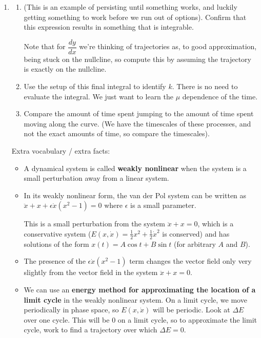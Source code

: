 \documentclass[12pt]{amsart}
\theoremstyle{plain}
\theoremstyle{definition}
\theoremstyle{definition}
\theoremstyle{plain}
\begin{document}
    \begin{enumerate}\item[]
        \begin{enumerate}[start=6]
\item[] (This is an example of persisting until something works, and luckily getting something to work before we run out of options). Confirm that this expression results in something that is integrable.

Note that for $\dfrac{dy}{dx}$ we're thinking of trajectories as, to good approximation, being stuck on the nullcline, so compute this by assuming the trajectory is exactly on the nullcline.
\item Use the setup of this final integral to identify $k$. There is no need to evaluate the integral. We just want to learn the $\mu$ dependence of the time.
\item Compare the amount of time spent jumping to the amount of time spent moving along the curve. (We have the timescales of these processes, and not the exact amounts of time, so compare the timescales).
        \end{enumerate}
        Extra vocabulary / extra facts:
        \begin{itemize}
            \item A dynamical system is called \textbf{weakly nonlinear} when the system is a small perturbation away from a linear system.
            \item In its weakly nonlinear form, the van der Pol system can be written as $\ddot x+x+\epsilon\dot x(x^2-1)=0$ where $\epsilon$ is a small parameter.

            This is a small perturbation from the system $\ddot x+x=0$, which is a conservative system ($E(x,\dot x)=\frac12x^2+\frac12\dot x^2$ is conserved) and has solutions of the form $x(t)=A\cos t+B\sin t$ (for arbitrary $A$ and $B$).
            \item The presence of the $\epsilon\dot x(x^2-1)$ term changes the vector field only very slightly from the vector field in the system $\ddot x+x=0$.
            \item We can use an \textbf{energy method for approximating the location of a limit cycle} in the weakly nonlinear system. On a limit cycle, we move periodically in phase space, so $E(x,\dot x)$ will be periodic. Look at $\Delta E$ over one cycle. This will be 0 on a limit cycle, so to approximate the limit cycle, work to find a trajectory over which $\Delta E=0$.
        \end{itemize}


\end{enumerate}
\end{document}
